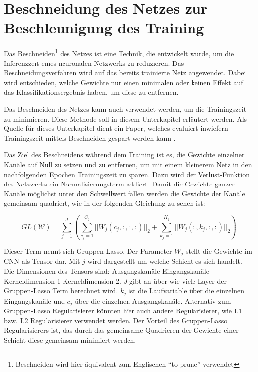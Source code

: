 \section{Beschneidung des Netzes zur Beschleunigung des Training}
\label{sec:prunetrain}
Das Beschneiden\footnote{Beschneiden wird hier äquivalent zum Englischen  "`to prune"' verwendet} des Netzes ist eine Technik, die entwickelt wurde, um die Inferenzzeit eines neuronalen Netzwerks zu reduzieren. Das Beschneidungsverfahren wird auf das bereits trainierte Netz angewendet. Dabei wird entschieden, welche Gewichte nur einen minimalen oder keinen Effekt auf das Klassifikationsergebnis haben, um diese zu entfernen.

Das Beschneiden des Netzes kann auch verwendet werden, um die Trainingszeit zu minimieren. Diese Methode soll in diesem Unterkapitel erläutert werden. Als Quelle für dieses Unterkapitel dient ein Paper, welches evaluiert inwiefern Trainingszeit mittels Beschneiden gespart werden kann \cite{prunetrain}.


Das Ziel des Beschneidens während dem Training ist es, die Gewichte einzelner Kanäle auf Null zu setzen und zu entfernen, um mit einem kleinerem Netz in den nachfolgenden Epochen Trainingszeit zu sparen. Dazu wird der Verlust-Funktion des Netzwerks ein Normalisierungsterm addiert. Damit die Gewichte ganzer Kanäle möglichst unter den Schwellwert fallen werden die Gewichte der Kanäle gemeinsam quadriert, wie in der folgenden Gleichung zu sehen ist:

\begin{equation}
GL(\mathcal{W})=\sum_{j=1}^{J} \left( \sum_{c_j=1}^{C_j} || W_{j} (c_j,:,:,:) ||_2 + \sum_{k_j=1}^{K_j} || W_{j}(:,k_j,:,:)||_2 \right)
 \label{equ:PTloss}
\end{equation}

Dieser Term nennt sich Gruppen-Lasso. Der Parameter $W_{j}$ stellt die Gewichte im CNN als Tensor dar. Mit $j$ wird dargestellt um welche Schicht es sich handelt. Die Dimensionen des Tensors sind: Ausgangskanäle \texttimes Eingangskanäle \texttimes Kerneldimension 1 \texttimes Kerneldimension 2. $J$ gibt an über wie viele Layer der Gruppen-Lasso Term berechnet wird. $k_j$ ist die Laufvariable über die einzelnen Eingangskanäle und $c_j$ über die einzelnen Ausgangskanäle. Alternativ zum Gruppen-Lasso Regularisierer könnten hier auch andere Regularisierer, wie L1 bzw. L2 Regularisierer verwendet werden. Der Vorteil des Gruppen-Lasso Regularisierers ist, das durch das gemeinsame Quadrieren der Gewichte einer Schicht diese gemeinsam minimiert werden.


